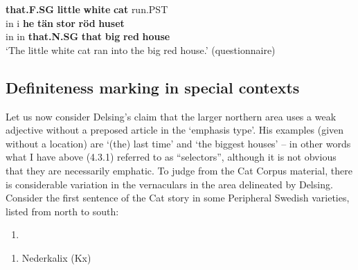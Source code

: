 \textbf{that.F.SG} \textbf{little} \textbf{white} \textbf{cat} run.PST\\ %


\ea\label{}
\gll in  i  \textbf{he} \textbf{tän} \textbf{stor} \textbf{röd} \textbf{huset} \\


in  in  \textbf{that.N.SG} \textbf{that} \textbf{big} \textbf{red} \textbf{house} \\ %


 ‘The little white cat ran into the big red house.’ (questionnaire)
\z


\subsection[Definiteness marking in special contexts]{\rmfamily Definiteness marking in special contexts}
Let us now consider Delsing’s claim that the larger northern area uses a weak adjective without a preposed article in the ‘emphasis type’. His examples (given without a location) are  ‘(the) last time’ and  ‘the biggest houses’ – in other words what I have above (4.3.1) referred to as “selectors”, although it is not obvious that they are necessarily emphatic. To judge from the Cat Corpus material, there is considerable variation in the vernaculars in the area delineated by Delsing. Consider the first sentence of the Cat story in some Peripheral Swedish varieties, listed from north to south:

\begin{enumerate} %
\item 
\end{enumerate} %
\setcounter{listLFOxcviiileveli}{0}
\begin{enumerate} %
\item 
Nederkalix (Kx)

\end{enumerate} %
\ea\label{}
\\


